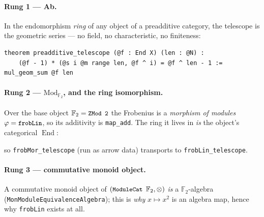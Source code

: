 \documentclass[11pt]{article}
\newcommand{\lc}[1]{\texttt{\small #1}}
\newcommand{\Ff}{\mathbb{F}_2}
\newcommand{\End}{\operatorname{End}}
\newcommand{\Module}{\operatorname{Module}}
\begin{document}
\paragraph{Rung 1 --- Ab.} In the endomorphism \emph{ring} of any object of a
preadditive category, the telescope is the geometric series --- no field, no
characteristic, no finiteness:
\begin{lstlisting}
theorem preadditive_telescope (@f : End X) (len : @N) :
    (@f - 1) * (@s i @m range len, @f ^ i) = @f ^ len - 1 := mul_geom_sum @f len
\end{lstlisting}

\paragraph{Rung 2 --- $\mathrm{Mod}_{\Ff}$, and the ring isomorphism.} Over the
base object $\Ff=\lc{ZMod 2}$ the Frobenius is a \emph{morphism of modules}
$\varphi=\lc{frobLin}$, so its additivity is \lc{map\_add}. The ring it lives in
\emph{is} the object's categorical $\End$:
\begin{center}
\end{center}
so \lc{frobMor\_telescope} (run as arrow data) transports to \lc{frobLin\_telescope}.

\paragraph{Rung 3 --- commutative monoid object.} A commutative monoid object of
$(\lc{ModuleCat }\Ff,\otimes)$ \emph{is} a $\Ff$-algebra
(\lc{MonModuleEquivalenceAlgebra}); this is \emph{why} $x\mapsto x^{2}$ is an
algebra map, hence why \lc{frobLin} exists at all.
\end{document}
